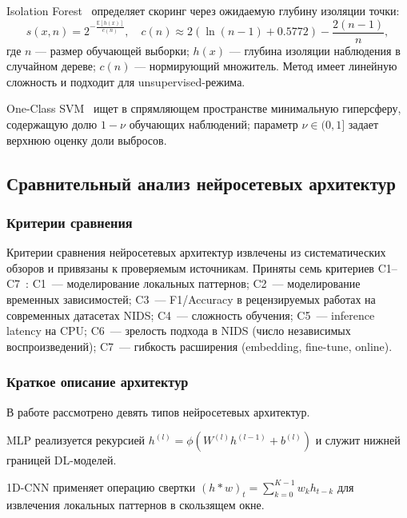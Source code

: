 Isolation Forest~\cite{liu2008isolation} определяет скоринг через
ожидаемую глубину изоляции точки:
\begin{equation}
s(x, n) = 2^{-\frac{\mathbb{E}[h(x)]}{c(n)}},\quad
c(n) \approx 2(\ln(n-1) + 0.5772) - \frac{2(n-1)}{n},
\label{eq:iforest}
\end{equation}
где \(n\) --- размер обучающей выборки; \(h(x)\) --- глубина
изоляции наблюдения в случайном дереве; \(c(n)\) --- нормирующий
множитель. Метод имеет линейную сложность и подходит для
unsupervised-режима.

One-Class SVM~\cite{scholkopf2001ocsvm} ищет в спрямляющем
пространстве минимальную гиперсферу, содержащую долю \(1-\nu\)
обучающих наблюдений; параметр \(\nu \in (0,1]\) задает верхнюю
оценку доли выбросов.

\subsection{Сравнительный анализ нейросетевых архитектур}

\subsubsection{Критерии сравнения}

Критерии сравнения нейросетевых архитектур извлечены из
систематических обзоров и привязаны к проверяемым источникам.
Приняты семь критериев C1--C7~\cite{khraisat2019survey,
ahmad2021nids, ferrag2020dlcyber, vinayakumar2019dl}:
C1~--- моделирование локальных паттернов;
C2~--- моделирование временных зависимостей;
C3~--- F1/Accuracy в рецензируемых работах на современных
датасетах NIDS;
C4~--- сложность обучения;
C5~--- inference latency на CPU;
C6~--- зрелость подхода в NIDS (число независимых
воспроизведений);
C7~--- гибкость расширения (embedding, fine-tune, online).

\subsubsection{Краткое описание архитектур}

В работе рассмотрено девять типов нейросетевых архитектур.

MLP реализуется рекурсией
\(h^{(l)} = \phi(W^{(l)} h^{(l-1)} + b^{(l)})\) и служит нижней
границей DL-моделей.

1D-CNN применяет операцию свертки
\((h * w)_t = \sum_{k=0}^{K-1} w_k h_{t-k}\) для извлечения локальных
паттернов в скользящем окне.

